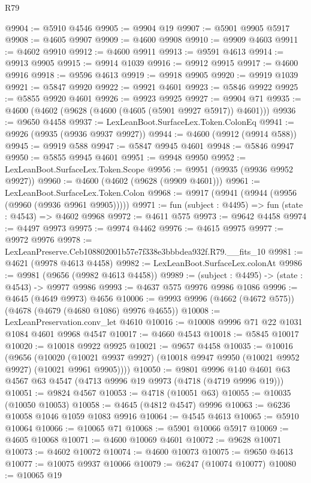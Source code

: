 \begin{lexlean}{R79}
\begin{coremodule}
@9904 := @5910 @4546
@9905 := @9904 @19
@9907 := @5901 @9905 @5917
@9908 := @4605 @9907
@9909 := @4600 @9908
@9910 := @9909 @4603
@9911 := @4602 @9910
@9912 := @4600 @9911
@9913 := @9591 @4613
@9914 := @9913 @9905
@9915 := @9914 @1039
@9916 := @9912 @9915
@9917 := @4600 @9916
@9918 := @9596 @4613
@9919 := @9918 @9905
@9920 := @9919 @1039
@9921 := @5847 @9920
@9922 := @9921 @4601
@9923 := @5846 @9922
@9925 := @5855 @9920 @4601
@9926 := @9923 @9925
@9927 := @9904 @71
@9935 := @4600 (@4602 (@9628 (@4600 (@4605 (@5901 @9927 @5917)) @4601)))
@9936 := @9650 @4458
@9937 := LexLeanBoot.SurfaceLex.Token.ColonEq
@9941 := @9926 (@9935 (@9936 @9937 @9927))
@9944 := @4600 (@9912 (@9914 @588))
@9945 := @9919 @588
@9947 := @5847 @9945 @4601
@9948 := @5846 @9947
@9950 := @5855 @9945 @4601
@9951 := @9948 @9950
@9952 := LexLeanBoot.SurfaceLex.Token.Scope
@9956 := @9951 (@9935 (@9936 @9952 @9927))
@9960 := @4600 (@4602 (@9628 (@9909 @4601)))
@9961 := LexLeanBoot.SurfaceLex.Token.Colon
@9968 := @9917 (@9941 (@9944 (@9956 (@9960 (@9936 @9961 @9905)))))
@9971 := fun (subject : @4495) => fun (state : @4543) => @4602 @9968
@9972 := @4611 @575
@9973 := @9642 @4458
@9974 := @4497 @9973
@9975 := @9974 @4462
@9976 := @4615 @9975
@9977 := @9972 @9976
@9978 := LexLeanPreserve.Ceb108802001b57e7f338e3bbbdea932f.R79.__fits_10
@9981 := @4621 (@9978 @4613 @4458)
@9982 := LexLeanBoot.SurfaceLex.colonAt
@9986 := @9981 (@9656 (@9982 @4613 @4458))
@9989 := (subject : @4495) -> (state : @4543) -> @9977 @9986
@9993 := @4637 @575 @9976 @9986 @1086
@9996 := @4645 (@4649 @9973) @4656
@10006 := @9993 @9996 (@4662 (@4672 @575)) (@4678 (@4679 (@4680 @1086) @9976 @4655))
@10008 := LexLeanPreservation.conv_let @4610
@10016 := @10008 @9996 @71 @22 @1031 @1084 @4601 @9968 @4547
@10017 := @4660 @4543
@10018 := @5845 @10017
@10020 := @10018 @9922 @9925
@10021 := @9657 @4458
@10035 := @10016
    (@9656
      (@10020 (@10021 @9937 @9927) (@10018 @9947 @9950 (@10021 @9952 @9927) (@10021 @9961 @9905))))
@10050 := @9801
    @9996
    @140
    @4601
    @63
    @4567
    @63
    @4547
    (@4713 @9996 @19 @9973 (@4718 (@4719 @9996 @19)))
@10051 := @9824 @4567
@10053 := @4718 (@10051 @63)
@10055 := @10035 (@10050 @10053)
@10058 := @4645 (@4812 @4547) @9996
@10063 := @6236 @10058 @1046 @1059 @1083 @9916
@10064 := @4545 @4613
@10065 := @5910 @10064
@10066 := @10065 @71
@10068 := @5901 @10066 @5917
@10069 := @4605 @10068
@10071 := @4600 @10069 @4601
@10072 := @9628 @10071
@10073 := @4602 @10072
@10074 := @4600 @10073
@10075 := @9650 @4613
@10077 := @10075 @9937 @10066
@10079 := @6247 (@10074 @10077)
@10080 := @10065 @19

\end{coremodule}
\end{lexlean}
